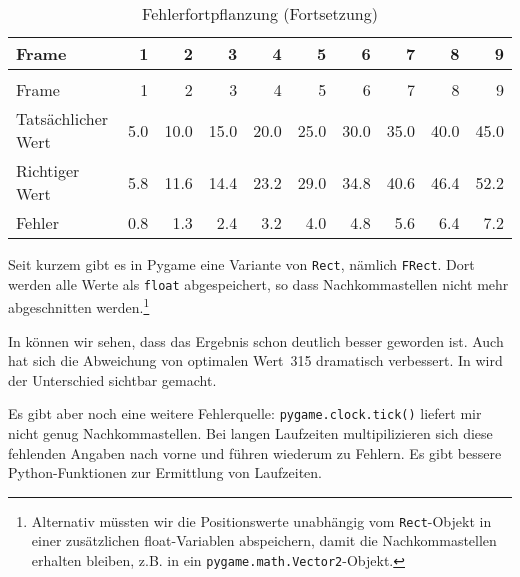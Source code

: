 \begin{longtable}{lrrrrrrrrr}
	\caption{Fehlerfortpflanzung}\label{tabFpsBewegung04} \\[1em]
    Frame & 1 & 2  & 3  & 4 & 5 &  6 & 7 & 8 & 9 \\[0.5em]\hline\hline
	\hline
	\endfirsthead %
	\caption{Fehlerfortpflanzung (Fortsetzung)}\\[1em]
    Frame & 1 & 2  & 3  & 4 & 5 &  6 & 7 & 8 & 9 \\[0.5em]\hline\hline
	\hline
	\endhead %
	Tatsächlicher Wert  & 5.0 & 10.0 & 15.0 & 20.0 & 25.0 & 30.0 & 35.0 & 40.0 & 45.0 \\ \hline
	Richtiger Wert      & 5.8 & 11.6 & 14.4 & 23.2 & 29.0 & 34.8 & 40.6 & 46.4 & 52.2 \\ \hline
	Fehler              & 0.8 & 1.3 & 2.4 & 3.2 & 4.0 & 4.8 & 5.6 & 6.4 & 7.2 \\ \hline
\end{longtable} 

Seit kurzem gibt es in Pygame eine Variante von \texttt{Rect}, nämlich \texttt{FRect}. Dort werden alle Werte als \texttt{float} abgespeichert, so dass Nachkommastellen nicht mehr abgeschnitten werden.\footnote{Alternativ müssten wir die Positionswerte unabhängig vom \texttt{Rect}-Objekt in einer zusätzlichen float-Variablen abspeichern, damit die Nachkommastellen erhalten bleiben, z.B. in ein \texttt{pygame.math.Vector2}-Objekt.} 

\newpage


In   können wir sehen, dass das Ergebnis schon deutlich besser geworden ist. Auch hat sich die Abweichung von optimalen Wert~315 dramatisch verbessert. In  wird der Unterschied sichtbar gemacht.


Es gibt aber noch eine weitere Fehlerquelle: \texttt{pygame.clock.tick()} liefert mir nicht genug Nachkommastellen. Bei langen Laufzeiten multipilizieren sich diese fehlenden Angaben nach vorne und führen wiederum zu Fehlern. Es gibt bessere Python-Funktionen zur Ermittlung von Laufzeiten.

